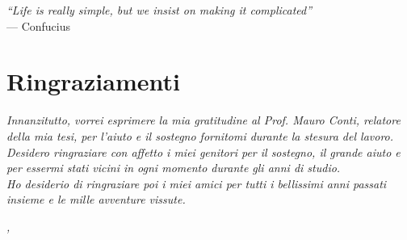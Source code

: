 \cleardoublepage
{}
{}

\begin{flushright}{
	\slshape
	``Life is really simple, but we insist on making it complicated''} \\
	\medskip
    --- Confucius
\end{flushright}


\bigskip

\begingroup
\let\clearpage\relax
\let\cleardoublepage\relax
\let\cleardoublepage\relax

\chapter*{Ringraziamenti}

\noindent \textit{Innanzitutto, vorrei esprimere la mia gratitudine al Prof.
Mauro Conti, relatore della mia tesi, per l'aiuto e il sostegno fornitomi
durante la stesura del lavoro.}\\

\noindent \textit{Desidero ringraziare con affetto i miei genitori per il
sostegno, il grande aiuto e per essermi stati vicini in ogni momento durante
gli anni di studio.}\\

\noindent \textit{Ho desiderio di ringraziare poi i miei amici per tutti i
bellissimi anni passati insieme e le mille avventure vissute.}\\
\bigskip

\noindent\textit{\myLocation, \myTime}
\hfill \myName

\endgroup
